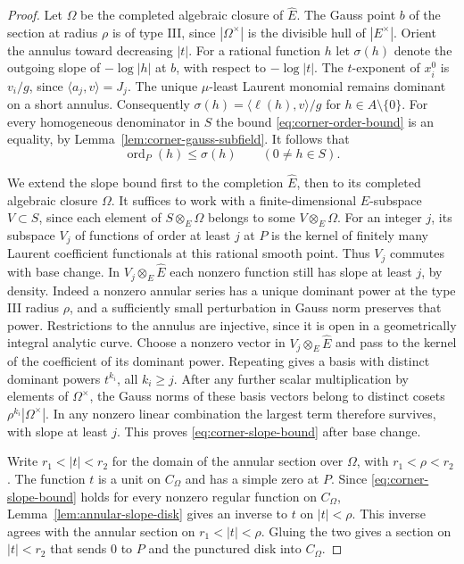 \documentclass[11pt,reqno]{amsart}
\numberwithin{equation}{section}
\theoremstyle{definition}
\theoremstyle{remark}
\DeclareMathOperator{\ord}{ord}
\begin{document}
\begin{proof}
Let \(\Omega\) be the completed algebraic closure of \(\widehat E\).
The Gauss point \(b\) of the section at radius \(\rho\) is of type III,
since \(|\Omega^\times|\) is the divisible hull of \(|E^\times|\).
Orient the annulus toward decreasing \(|t|\). For a rational function
\(h\) let \(\sigma(h)\) denote the outgoing slope of \(-\log|h|\)
at \(b\), with respect to \(-\log|t|\). The \(t\)-exponent of \(x^0_i\)
is \(v_i/g\), since \(\langle a_j,v\rangle=J_j\). The unique
\(\mu\)-least Laurent monomial remains dominant on a short annulus.
Consequently \(\sigma(h)=\langle\ell(h),v\rangle/g\) for \(h\in A\setminus\{0\}\).
For every homogeneous denominator in \(S\) the bound
\eqref{eq:corner-order-bound} is an equality, by
Lemma~\ref{lem:corner-gauss-subfield}. It follows that
\begin{equation}\label{eq:corner-slope-bound}
 \ord_P(h)\le\sigma(h)\qquad(0\ne h\in S).
\end{equation}

We extend the slope bound first to the completion \(\widehat E\), then
to its completed algebraic closure \(\Omega\). It suffices to work
with a finite-dimensional \(E\)-subspace \(V\subset S\), since each
element of \(S\otimes_E\Omega\) belongs to some \(V\otimes_E\Omega\).
For an integer \(j\), its subspace \(V_j\) of functions of order
at least \(j\) at \(P\) is the kernel of finitely many Laurent
coefficient functionals at this rational smooth point. Thus \(V_j\)
commutes with base change. In \(V_j\otimes_E\widehat E\) each nonzero
function still has slope at least \(j\), by density. Indeed a
nonzero annular series has a unique dominant power at the type III
radius \(\rho\), and a sufficiently small perturbation in Gauss norm
preserves that power. Restrictions to the annulus are injective,
since it is open in a geometrically integral analytic curve.
Choose a nonzero vector in \(V_j\otimes_E\widehat E\) and pass to
the kernel of the coefficient of its dominant power. Repeating gives
a basis with distinct dominant powers \(t^{k_i}\), all \(k_i\ge j\).
After any further scalar multiplication by elements of \(\Omega^\times\),
the Gauss norms of these basis vectors belong to distinct cosets
\(\rho^{k_i}|\Omega^\times|\). In any nonzero linear combination the
largest term therefore survives, with slope at least \(j\).
This proves \eqref{eq:corner-slope-bound} after base change.

Write \(r_1<|t|<r_2\) for the domain of the annular section over
\(\Omega\), with \(r_1<\rho<r_2\). The function \(t\) is a unit on
\(C_\Omega\) and has a simple zero at \(P\). Since
\eqref{eq:corner-slope-bound} holds for every nonzero regular function on
\(C_\Omega\), Lemma~\ref{lem:annular-slope-disk} gives an inverse to \(t\)
on \(|t|<\rho\). This inverse agrees with the annular section on
\(r_1<|t|<\rho\). Gluing the two gives a section on \(|t|<r_2\) that
sends \(0\) to \(P\) and the punctured disk into \(C_\Omega\).


\end{proof}
\end{document}
